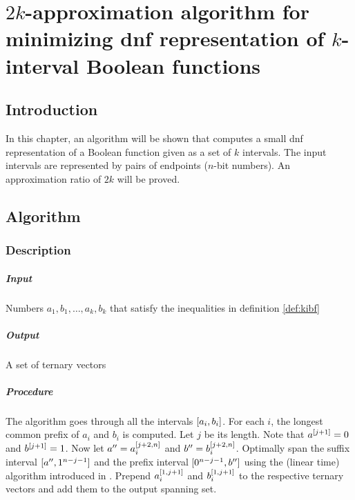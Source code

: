 \chapter{\texorpdfstring{$2k$}{2k}-approximation algorithm
for minimizing \texorpdfstring{\acrshort{dnf}}{DNF} representation
of \texorpdfstring{$k$}{k}-interval Boolean functions}
\label{chap:2kapprox}

\section{Introduction}
In this chapter,
an algorithm will be shown that computes
a small \acrshort{dnf} representation
of a Boolean function given as a set of $k$ intervals.
The input intervals are represented by pairs of endpoints
($n$-bit numbers).
An approximation ratio of $2k$ will be proved.

\section{Algorithm}

\subsection{Description}
\paragraph{Input}
Numbers $a_1, b_1, \ldots, a_k, b_k$
that satisfy the inequalities in definition \ref{def:kibf}

\paragraph{Output}
A set of ternary vectors

\paragraph{Procedure}
The algorithm goes through
all the intervals $[a_i, b_i]$.
For each $i$, the longest common prefix of $a_i$ and $b_i$
is computed. Let $j$ be its length.
Note that $a^{[j+1]} = 0$ and $b^{[j+1]} = 1$.
Now let $a'' = a_i^{[j+2, n]}$
and $b'' = b_i^{[j+2, n]}$.
Optimally span the suffix interval
$[a'', 1^{n-j-1}]$
and the prefix interval
$[0^{n-j-1}, b'']$
using the (linear time) algorithm
introduced in \cite{Schieber2005154}.
Prepend $a_i^{[1, j+1]}$
and $b_i^{[1, j+1]}$
to the respective ternary vectors
and add them to the output spanning set.

